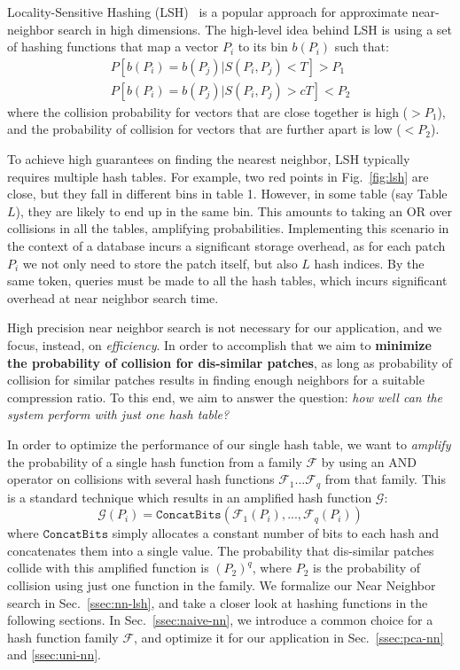 Locality-Sensitive Hashing (LSH)~\cite{LSH:Andoni}
is a popular approach for approximate near-neighbor search
in high dimensions. The high-level idea behind LSH is
using a set of hashing functions that map
a vector $P_i$ to its bin $b(P_i)$ such that:
\begin{equation*}
\begin{aligned}
P[b(P_i) = b(P_j) | S(P_i, P_j) < T] > P_1\\
P[b(P_i) = b(P_j) | S(P_i, P_j) > cT] < P_2
\end{aligned}
\end{equation*}
where the collision probability
for vectors that are close together is high
($> P_1$), and the probability of collision
for vectors that are further apart is low ($< P_2$).

To achieve high guarantees on finding the nearest
neighbor, LSH typically requires multiple hash tables.
For example, two red points in Fig.~\ref{fig:lsh} are close,
but they fall in different bins in table 1. However,
in some table (say Table $L$), they are likely to end up in
the same bin. This amounts to taking an OR over
collisions in all the tables, amplifying probabilities.
Implementing this scenario in the context
of a database incurs a significant storage overhead, as for each
patch $P_i$ we not only need to store the patch itself,
but also $L$ hash indices. By the same token,
queries must be made to all the hash tables, which incurs significant
overhead at near neighbor search time.

High precision near neighbor search is not necessary
for our application, and we focus, instead, on \emph{efficiency}.
In order to accomplish that we aim to \textbf{minimize the
probability of collision for dis-similar patches}, as long
as probability of collision for similar patches results in
finding enough neighbors for a suitable compression ratio.
To this end, we aim to answer the question:
\emph{how well can the system perform with just one hash table?}

In order to optimize the performance of our single hash table,
we want to \emph{amplify} the probability of a single hash
function from a family $\mathcal{F}$ by using an AND operator
on collisions with several hash functions
$\mathcal{F}_1...\mathcal{F}_q$ from that family.
This is a standard technique which results in an amplified
hash function $\mathcal{G}$:
\begin{equation}
\mathcal{G}(P_i) = \mathtt{ConcatBits}(\mathcal{F}_1(P_i),...,\mathcal{F}_q(P_i))
\end{equation}\label{eq:ampl}
\noindent where $\mathtt{ConcatBits}$ simply allocates a constant
number of bits to each hash and concatenates them into a single value.
The probability that dis-similar patches collide with
this amplified function is $(P_2)^q$, where $P_2$ is the
probability of collision using just one function in the family.
We formalize our Near Neighbor search in Sec.~\ref{ssec:nn-lsh},
and take a closer look at hashing functions in the following sections.
In Sec.~\ref{ssec:naive-nn}, we introduce a common choice for a
 hash function family $\mathcal{F}$, and optimize it for our application in Sec.~\ref{ssec:pca-nn}
and \ref{ssec:uni-nn}.

